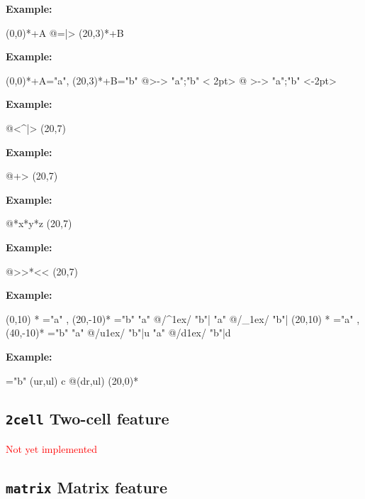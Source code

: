 \documentclass{article}
\newenvironment{code}{\par\noindent\textbf{Example:}\par\noindent}{}
\def\NotYet#1{\textcolor{red}{#1}}
\begin{document}
\begin{code}
\xy (0,0)*+{A}
 \ar @{=|>} (20,3)*+{B}
\endxy
\end{code}
\newdir{ >}{{}*!/-5pt/\dir{>}}
\begin{code}
\xy (0,0)*+{A}="a", (20,3)*+{B}="b"
 \ar @{>->}  "a";"b" < 2pt>
 \ar @{ >->} "a";"b" <-2pt>
\endxy
\end{code}
\begin{code}
\xy\ar @{<^{|}>} (20,7)\endxy
\end{code}
\begin{code}
\xy\ar @{{}{+}>} (20,7)\endxy
\end{code}
\begin{code}
\xy\ar @{*{x}*{y}*{z}} (20,7)\endxy
\end{code}
\begin{code}
\xy
 \ar @{>>*<<}
 (20,7)
\endxy
\end{code}
\begin{code}
\xy
 \POS (0,10)  *\cir<2pt>{} ="a"
    , (20,-10)*\cir<2pt>{} ="b"
 \POS"a" \ar @/^1ex/ "b"|\uparrow
 \POS"a" \ar @/_1ex/ "b"|\downarrow
%
 \POS (20,10) *\cir<2pt>{} ="a"
    , (40,-10)*\cir<2pt>{} ="b"
 \POS"a" \ar @/u1ex/ "b"|u
 \POS"a" \ar @/d1ex/ "b"|d
\endxy
\end{code}
\begin{code}
\xy *{\circ}="b" \ar@(ur,ul) c
 @(dr,ul) (20,0)*{\bullet}
\endxy
\end{code}

\subsection{\texttt{2cell} Two-cell feature}
\NotYet{Not yet implemented}
\subsection{\texttt{matrix} Matrix feature}

\end{document}
